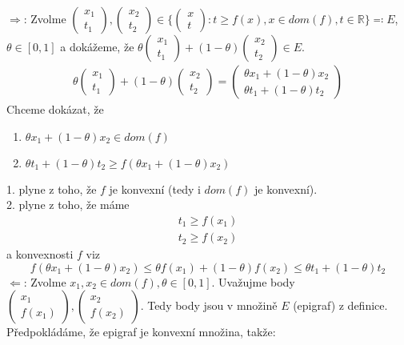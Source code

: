 \documentclass[10pt, a4paper]{article}
\begin{document}
\section{}
$\Rightarrow$: Zvolme $\begin{pmatrix} x_1 \\ t_1\end{pmatrix}, \begin{pmatrix} x_2 \\ t_2\end{pmatrix} \in \{\begin{pmatrix} x \\ t\end{pmatrix}: t \geq f(x), x \in dom(f), t \in \mathbb{R} \} \eqqcolon E$, $\theta \in [0,1]$ a dokážeme, že $\theta \begin{pmatrix} x_1 \\ t_1\end{pmatrix} + (1-\theta) \begin{pmatrix} x_2 \\ t_2\end{pmatrix} \in E$.
\begin{gather*}
\theta \begin{pmatrix} x_1 \\ t_1\end{pmatrix} + (1-\theta) \begin{pmatrix} x_2 \\ t_2\end{pmatrix} = \begin{pmatrix} \theta x_1 + (1-\theta) x_2 \\ \theta t_1 + (1-\theta) t_2\end{pmatrix}
\end{gather*}
Chceme dokázat, že 
\begin{enumerate}
\item $\theta x_1 + (1-\theta) x_2 \in dom(f)$
\item $\theta t_1 + (1-\theta) t_2 \geq f(\theta x_1 + (1-\theta) x_2)$
\end{enumerate}
1. plyne z toho, že $f$ je konvexní (tedy i $dom(f)$ je konvexní).\\
2. plyne z toho, že máme
\begin{gather*}
t_1 \geq f(x_1)\\
t_2 \geq f(x_2)
\end{gather*}
a konvexnosti $f$ viz
\[
f(\theta x_1 + (1-\theta) x_2) \leq \theta f(x_1) + (1-\theta)f(x_2) \leq \theta t_1 + (1-\theta) t_2
\]
$\Leftarrow$:
Zvolme $x_1, x_2 \in dom(f), \theta \in [0,1]$. Uvažujme body $\begin{pmatrix} x_1 \\ f(x_1)\end{pmatrix}, \begin{pmatrix} x_2 \\ f(x_2)\end{pmatrix}$. Tedy body jsou v množině $E$ (epigraf) z definice. Předpokládáme, že epigraf je konvexní množina, takže:
\end{document}
